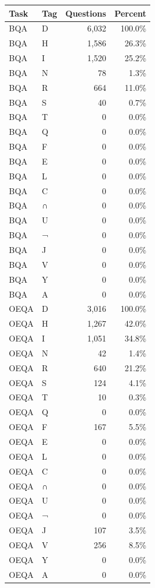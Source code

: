 \begin{tabular}{llrr}
\toprule
Task & Tag & Questions & Percent \\
\midrule
BQA & D & 6,032 & 100.0\% \\
BQA & H & 1,586 & 26.3\% \\
BQA & I & 1,520 & 25.2\% \\
BQA & N & 78 & 1.3\% \\
BQA & R & 664 & 11.0\% \\
BQA & S & 40 & 0.7\% \\
BQA & T & 0 & 0.0\% \\
BQA & Q & 0 & 0.0\% \\
BQA & F & 0 & 0.0\% \\
BQA & E & 0 & 0.0\% \\
BQA & L & 0 & 0.0\% \\
BQA & C & 0 & 0.0\% \\
BQA & ∩ & 0 & 0.0\% \\
BQA & U & 0 & 0.0\% \\
BQA & ¬ & 0 & 0.0\% \\
BQA & J & 0 & 0.0\% \\
BQA & V & 0 & 0.0\% \\
BQA & Y & 0 & 0.0\% \\
BQA & A & 0 & 0.0\% \\
OEQA & D & 3,016 & 100.0\% \\
OEQA & H & 1,267 & 42.0\% \\
OEQA & I & 1,051 & 34.8\% \\
OEQA & N & 42 & 1.4\% \\
OEQA & R & 640 & 21.2\% \\
OEQA & S & 124 & 4.1\% \\
OEQA & T & 10 & 0.3\% \\
OEQA & Q & 0 & 0.0\% \\
OEQA & F & 167 & 5.5\% \\
OEQA & E & 0 & 0.0\% \\
OEQA & L & 0 & 0.0\% \\
OEQA & C & 0 & 0.0\% \\
OEQA & ∩ & 0 & 0.0\% \\
OEQA & U & 0 & 0.0\% \\
OEQA & ¬ & 0 & 0.0\% \\
OEQA & J & 107 & 3.5\% \\
OEQA & V & 256 & 8.5\% \\
OEQA & Y & 0 & 0.0\% \\
OEQA & A & 0 & 0.0\% \\
\bottomrule
\end{tabular}
